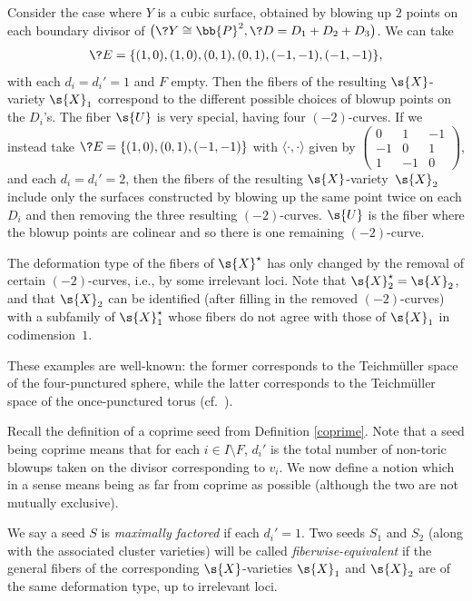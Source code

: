 \begin{eg}\label{cubic cluster}
Consider the case where $Y$ is a cubic surface, obtained by blowing up $2$ points on each boundary divisor of $\big(\?{Y}\cong \bb{P}^2,\?{D}=D_1+D_2+D_3\big)$. We can take
\begin{gather*}
	\?{E}=\{(1,0),(1,0),(0,1),(0,1),(-1,-1),(-1,-1)\},
\end{gather*}
with each $d_i=d_i'=1$ and $F$ empty. Then the fibers of the resulting $\s{X}$-variety $\s{X}_1$ correspond to the different possible choices of blowup points on the $D_i$'s. The fiber $\s{U}$ is very special, having four $(-2)$-curves. If we instead take $\?{E}=\{(1,0),(0,1),(-1,-1)\}$ with $\langle \cdot,\cdot\rangle$ given by
	$\left(\begin{smallmatrix}
		0 &1 &-1 \\
	 -1 &0 &1 \\
	 1 &-1 &0
		\end{smallmatrix}\right)$,
		and each $d_i=d_i'=2$, then the fibers of the resulting $\s{X}$-variety~$\s{X}_2$ include only the surfaces constructed by blowing up the same point twice on each $D_i$ and then removing the three resulting $(-2)$-curves. $\s{U}$ is the fiber where the blowup points are colinear and so there is one remaining $(-2)$-curve.
		
The deformation type of the fibers of $\s{X}^{\star}$ has only changed by the removal of certain $(-2)$-curves, i.e., by some irrelevant loci. Note that $\s{X}^{\star}_2=\s{X}_2$, and that $\s{X}_2$ can be identified (after filling in the removed $(-2)$-curves) with a subfamily of $\s{X}^{\star}_1$ whose fibers do not agree with those of $\s{X}_1$ in codimension~$1$.

These examples are well-known: the former corresponds to the Teichm\"{u}ller space of the four-punctured sphere, while the latter corresponds to the Teichm\"{u}ller space of the once-punctured torus (cf.\ \cite[Section~2.7]{FG1}).
\end{eg}

Recall the definition of a coprime seed from Definition \ref{coprime}. Note that a seed being coprime means that for each $i\in I\setminus F$, $d_i'$ is the total number of non-toric blowups taken on the divisor corresponding to $v_i$. We now define a notion which in a sense means being as far from coprime as possible (although the two are not mutually exclusive).

\begin{dfn}\label{EquivalentClusters} We say a seed $S$ is {\it maximally factored} if each $d_i'=1$. Two seeds $S_1$ and $S_2$ (along with the associated cluster varieties) will be called {\it fiberwise-equivalent} if the general fibers of the corresponding $\s{X}$-varieties $\s{X}_1$ and $\s{X}_2$ are of the same deformation type, up to irrelevant loci.
\end{dfn}

